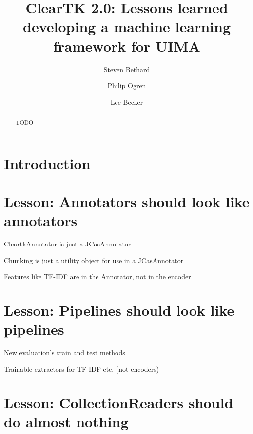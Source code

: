 \documentclass{llncs}
\begin{document}
\title{ClearTK 2.0: Lessons learned developing a machine learning framework for UIMA}

\author{Steven Bethard \and Philip Ogren \and Lee Becker}


\maketitle

\begin{abstract}
TODO

\end{abstract}

\section{Introduction}


\section{Lesson: Annotators should look like annotators}

CleartkAnnotator is just a JCasAnnotator

Chunking is just a utility object for use in a JCasAnnotator

Features like TF-IDF are in the Annotator, not in the encoder


\section{Lesson: Pipelines should look like pipelines}

New evaluation's train and test methods

Trainable extractors for TF-IDF etc. (not encoders)


\section{Lesson: CollectionReaders should do almost nothing}
\end{document}
